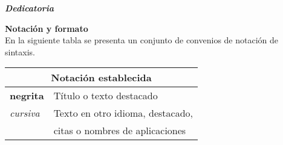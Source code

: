 \blankpage{}

\thispagestyle{prefacepage}
{\large \textbf{\textit{Dedicatoria}}}
\vspace{0.5cm} \\
\lorem{}

\blankpage{}

\thispagestyle{prefacepage}
{\large \textbf{Notación y formato}} \smallskip
\vspace{0.5cm}\\
En la siguiente tabla se presenta un conjunto de convenios de notación de sintaxis.\smallskip
\vspace{0.5cm}
\begin{center}
    \begin{tabular}{|l|l|} \hline
        \multicolumn{2}{|c|}{Notación establecida} \\ \hline
        \textbf{negrita} & Título o texto destacado \\ \hline
        \textit{cursiva} & Texto en otro idioma, destacado, \\ & citas o nombres de aplicaciones \\ \hline
    \end{tabular}
\end{center}
